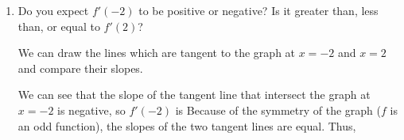 \documentclass{article}
\begin{document}
\begin{enumerate}[resume]
\begin{enumerate}
    \begin{solution}
      On the graph, we can draw the line tangent to the graph at $x=2$ (in red) and compare
      its slope, $f'(2)$, to $f'(1)$.
      \begin{center}
      \end{center}
      The red line has a negative slope, so $f'(2)$ is  The slope
      is less steep than the slope of the blue line, so $f'(2)$ is less negative than
      $f'(1)$. This means 
    \end{solution}

  \item
    \begin{problem}[\vfill\newpage]
      Do you expect $f'(-2)$ to be positive or negative? Is it greater than, less than, or equal to $f'(2)$?
    \end{problem}

    \begin{solution}
      We can draw the lines which are tangent to the graph at $x=-2$ and $x=2$ and compare
      their slopes.
      \begin{center}
      \end{center}
      We can see that the slope of the tangent line that intersect the graph at $x=-2$ is
      negative, so $f'(-2)$ is  Because of the symmetry of the graph ($f$ is
      an odd function), the slopes of the two tangent lines are equal. Thus, 
    \end{solution}


\end{enumerate}
\end{enumerate}
\end{document}

